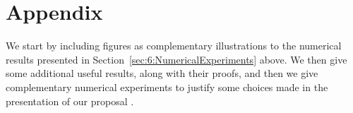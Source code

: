 







\newpage
\section{Appendix}
\label{sec:6:appendix}

We start by including figures as complementary illustrations to the numerical results presented in Section~\ref{sec:6:NumericalExperiments} above.
We then give some additional useful results, along with their proofs, and then we give complementary numerical experiments to justify some choices made in the presentation of our proposal \GLRklUCB.


